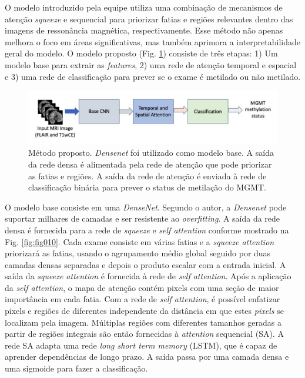 O modelo introduzido pela equipe utiliza uma combinação de mecanismos de atenção \textit{squeeze} e sequencial para priorizar fatias e regiões relevantes dentro das imagens de ressonância magnética, respectivamente. Esse método não apenas melhora o foco em áreas significativas, mas também aprimora a interpretabilidade geral do modelo. O modelo proposto (Fig. \ref{fig:fig009}) consiste de três etapas: 1) Um modelo base para extrair as \textit{features}, 2) uma rede de atenção temporal e espacial e 3) uma rede de classificação para prever se o exame é metilado ou não metilado. 

\begin{figure}[htbp]
    \centering
    \includegraphics[width=1\textwidth]{figures/fig009.png}
    \caption{Método proposto. \textit{Densenet} foi utilizado como modelo base. A saída da rede densa é alimentada pela rede de atenção que pode priorizar as fatias e regiões. A saída da rede de atenção é enviada à rede de classificação binária para prever o status de metilação do MGMT.}
    \label{fig:fig009}
\end{figure}

O modelo base consiste em uma \textit{DenseNet}. Segundo o autor, a \textit{Densenet} pode suportar milhares de camadas e ser resistente ao \textit{overfitting}. A saída da rede densa é fornecida para a rede de \textit{squeeze} e \textit{self attention} conforme mostrado na Fig. \ref{fig:fig010}. Cada exame consiste em várias fatias e a \textit{squeeze attention} priorizará as fatias, usando o agrupamento médio global seguido por duas camadas densas separadas e depois o produto escalar com a entrada inicial. A saída da \textit{squeeze attention} é fornecida à rede de \textit{self attention}. Após a aplicação da \textit{self attention}, o mapa de atenção contém pixels com uma seção de maior importância em cada fatia. Com a rede de \textit{self attention}, é possível enfatizar pixels e regiões de diferentes independente da distância em que estes \textit{pixels} se localizam pela imagem. Múltiplas regiões com diferentes tamanhos geradas a partir de regiões integrais são então fornecidas à \textit{attention} sequencial (SA). A rede SA adapta uma rede \textit{long short term memory} (LSTM), que é capaz de aprender dependências de longo prazo. A saída passa por uma camada densa e uma sigmoide para fazer a classificação.

